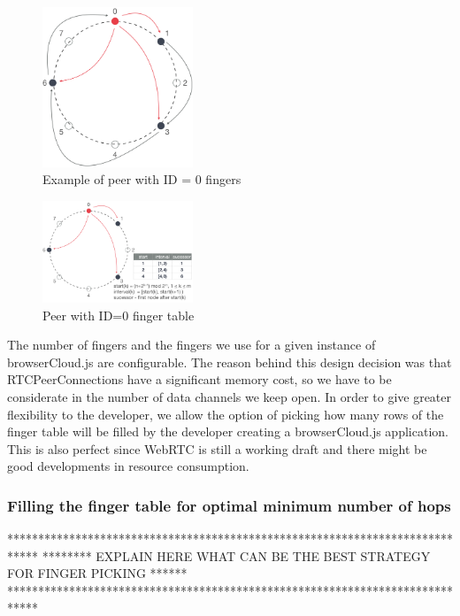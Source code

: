 \begin{figure}[h!]
  \centering
  \includegraphics[width=0.4\textwidth]{figs/chord-5}
  \caption{Example of peer with ID = 0 fingers}
  \label{fig:c-5}
\end{figure}

\begin{figure}[h!]
  \centering
  \includegraphics[width=0.4\textwidth]{figs/chord-6}
  \caption{Peer with ID=0 finger table}
  \label{fig:c-6}
\end{figure}

The number of fingers and the fingers we use for a given instance of browserCloud.js are configurable. The reason behind this design decision was that RTCPeerConnections have a significant memory cost, so we have to be considerate in the number of data channels we keep open. In order to give greater flexibility to the developer, we allow the option of picking how many rows of the finger table will be filled by the developer creating a browserCloud.js application. This is also perfect since WebRTC is still a working draft and there might be good developments in resource consumption.

\subsubsection{Filling the finger table for optimal minimum number of hops}

*****************************************************************************
******** EXPLAIN HERE WHAT CAN BE THE BEST STRATEGY FOR FINGER PICKING ******
*****************************************************************************


